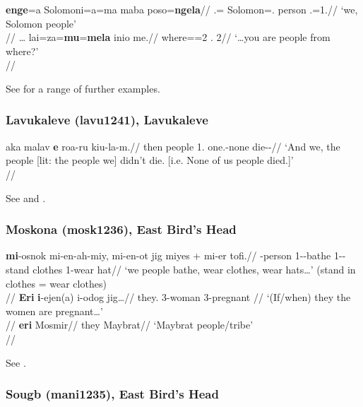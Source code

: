 \documentclass[A4paper]{article}
\begin{document}
\pex
\a
\begingl 
\gla \textbf{enge}=a Solomoni=a=ma maba poso=\textbf{ngela}//
\Pl{}.\Excl{}=\Lig{} Solomon=\Sg{}.\F{} person \Pl{}.\M{}=1\Pl{}.\Excl{}//
\glft `we, Solomon people' \\{\citep[85, (7.35)]{obata2003}}//
\endgl
\a 
\begingl
\gla \ldots{} lai=za=\textbf{mu}=\textbf{mela} inio me.//
\glb {} where=\Pl{}=2\Pl{}{} \Foc{}.\Nf{} 2\Pl{}//
\glft `\ldots you are people from where?' \\\citep[88, (7.49)]{obata2003}//
\endgl
\xe

See \citet[47--49, 76, 79, 84f., 87--89, 92f.]{obata2003} for a range of further examples.

\subsubsection{Lavukaleve (lavu1241), Lavukaleve}

\ex 
\begingl
\gla aka {malav} \textbf{e} roa-ru kiu-la-m.//
\glb then people 1\Pl{}.\Excl{} one.\Sg{}\M{}-none die-\Neg{}-\Sg{}\M{}//
\glft `And we, the people [lit: the people we] didn't die. [i.e. None of us people died.]'\\{\citep[after][171, (197)]{terrill2003}}//
\endgl
\xe

See \citet[171--173]{terrill2003} and \citet[435, (27)]{terrill2004}.

\subsubsection{Moskona (mosk1236), East Bird's Head}

\pex
\a
\begingl
\gla \textbf{mi}-osnok mi-en-ah-miy,  mi-en-ot jig miyes + mi-er tofi.//
\Pl{}-person 1\Pl-\Dur{}-bathe 1\Pl-\Dur{}-stand \Loc{} clothes 1\Pl{}-wear hat//
\glft `we people bathe, wear clothes, wear hats\ldots' (stand in clothes = wear clothes)\\
\citep[344, (2)]{gravelle2010}//
\endgl
\a
\begingl
\gla \textbf{Eri} \textbf{i}-ejen(a) i-odog jig\ldots//
\glb they.\Pl{} 3\Pl-woman 3\Pl-pregnant \Loc{}//
\glft `(If/when) they the women are pregnant\ldots' \\
\citep[91, (38)]{gravelle2010}//
\endgl
\a 
\begingl
\gla \textbf{eri} Mosmir//
\glb they Maybrat//
\glft `Maybrat people/tribe'\\
\citep[224, (43b)]{gravelle2010}//
\endgl
\xe

See \citet[91, 222--224, 344]{gravelle2010}.
 
\subsubsection{Sougb (mani1235), East Bird's Head}
\end{document}

